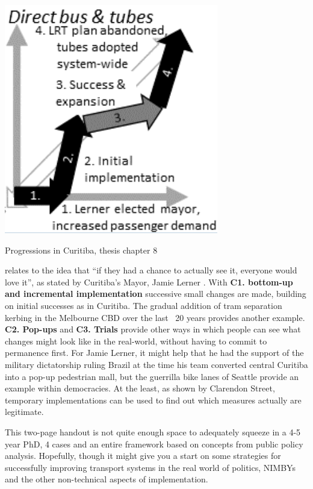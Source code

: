 \documentclass{tufte-handout}
\begin{document}
\begin{marginfigure}
        \includegraphics[width=\linewidth]{Curitiba_3}
  \caption{Progressions in Curitiba, thesis chapter 8}
  \label{fig:Curitiba}
\end{marginfigure}

 relates to the idea that “if they had a chance to actually see it, everyone would love it”, as stated by Curitiba's Mayor, Jamie Lerner \cite{McKibben:2007aa}. With \textbf{C1. bottom-up and incremental implementation} successive small changes are made, building on initial successes as in Curitiba. The gradual addition of tram separation kerbing in the Melbourne CBD over the last ~20 years provides another example. \textbf{C2. Pop-ups} and \textbf{C3. Trials} provide other ways in which people can see what changes might look like in the real-world, without having to commit to permanence first.  For Jamie Lerner, it might help that he had the support of the military dictatorship ruling Brazil at the time his team converted central Curitiba into a pop-up pedestrian mall, but the guerrilla bike lanes of Seattle\cite{Fucoloro:2013aa} provide an example within democracies. At the least, as shown by Clarendon Street\cite{Silkstone:2005aa}, temporary implementations can be used to find out which measures actually are legitimate.

This two-page handout is not quite enough space to adequately squeeze in a 4-5 year PhD, 4 cases and an entire framework based on concepts from public policy analysis. Hopefully, though it might give you a start on some strategies for successfully improving transport systems in the real world of politics, NIMBYs and the other non-technical aspects of implementation. 



\end{document}
